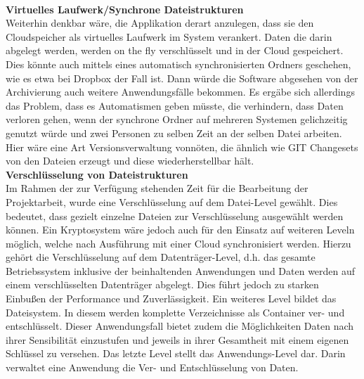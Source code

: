 \documentclass[12pt,a4paper,bibliography=totocnumbered,listof=totocnumbered]{scrartcl}
\begin{document}
\\\textbf{Virtuelles Laufwerk/Synchrone Dateistrukturen}\\
Weiterhin denkbar wäre, die Applikation derart anzulegen, dass sie den Cloudspeicher als virtuelles Laufwerk im System verankert. Daten die darin abgelegt werden, werden on the fly verschlüsselt und in der Cloud gespeichert. Dies könnte auch mittels eines automatisch synchronisierten Ordners geschehen, wie es etwa bei Dropbox der Fall ist. Dann würde die Software abgesehen von der Archivierung auch weitere Anwendungsfälle bekommen. Es ergäbe sich allerdings das Problem, dass es Automatismen geben müsste, die verhindern, dass Daten verloren gehen, wenn der synchrone Ordner auf mehreren Systemen gelichzeitig genutzt würde und zwei Personen zu selben Zeit an der selben Datei arbeiten. Hier wäre eine Art Versionsverwaltung vonnöten, die ähnlich wie GIT Changesets von den Dateien erzeugt und diese wiederherstellbar hält.
\\\textbf{Verschlüsselung von Dateistrukturen}\\
Im Rahmen der zur Verfügung stehenden Zeit für die Bearbeitung der Projektarbeit, wurde eine Verschlüsselung auf dem Datei-Level gewählt. Dies bedeutet, dass gezielt einzelne Dateien zur Verschlüsselung ausgewählt werden können. Ein Kryptosystem wäre jedoch auch für den Einsatz auf weiteren Leveln möglich, welche nach Ausführung mit einer Cloud synchronisiert werden. Hierzu gehört die Verschlüsselung auf dem Datenträger-Level, d.h. das gesamte Betriebssystem inklusive der beinhaltenden Anwendungen und Daten werden auf einem verschlüsselten Datenträger abgelegt. Dies führt jedoch zu starken Einbußen der Performance und Zuverlässigkeit. Ein weiteres Level bildet das Dateisystem. In diesem werden komplette Verzeichnisse als Container ver- und entschlüsselt. Dieser Anwendungsfall bietet zudem die Möglichkeiten Daten nach ihrer Sensibilität einzustufen und jeweils in ihrer Gesamtheit mit einem eigenen Schlüssel zu versehen. Das letzte Level stellt das Anwendungs-Level dar. Darin verwaltet eine Anwendung die Ver- und Entschlüsselung von Daten. \\
\cite{38}
\end{document}

